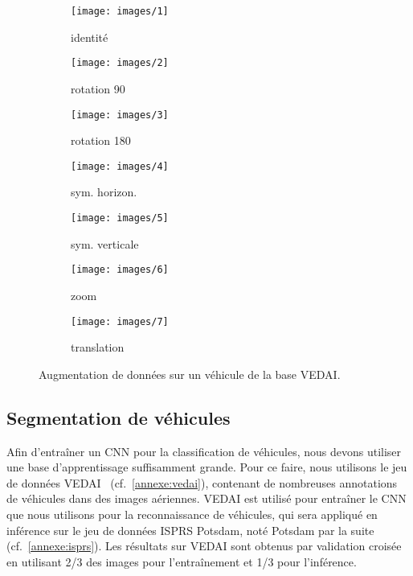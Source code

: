 \begin{figure}[t]
	\begin{subfigure}{0.142\textwidth}
    	\texttt{[image: images/1]}
        \caption*{identité}
    \end{subfigure}%
    \begin{subfigure}{0.142\textwidth}
    	\texttt{[image: images/2]}
        \caption*{rotation 90\degre}
    \end{subfigure}%
    \begin{subfigure}{0.142\textwidth}
    	\texttt{[image: images/3]}
        \caption*{rotation 180\degre}
    \end{subfigure}%
    \begin{subfigure}{0.142\textwidth}
    	\texttt{[image: images/4]}
        \caption*{sym. horizon.}
    \end{subfigure}%
    \begin{subfigure}{0.142\textwidth}
    	\texttt{[image: images/5]}
        \caption*{sym. verticale}
    \end{subfigure}%
    \begin{subfigure}{0.142\textwidth}
    	\texttt{[image: images/6]}
        \caption*{zoom}
    \end{subfigure}%
    \begin{subfigure}{0.142\textwidth}
    	\texttt{[image: images/7]}
        \caption*{translation}
    \end{subfigure}
    \caption{Augmentation de données sur un véhicule de la base \gls{VEDAI}.}
    \label{fig:augmented_car}
\end{figure}

\subsection{Segmentation de véhicules}

Afin d'entraîner un \gls{CNN} pour la classification de véhicules, nous devons utiliser une base d'apprentissage suffisamment grande. Pour ce faire, nous utilisons le jeu de données \gls{VEDAI}~\cite{razakarivony_vehicle_2016} (cf.~\cref{annexe:vedai}), contenant de nombreuses annotations de véhicules dans des images aériennes. \gls{VEDAI} est utilisé pour entraîner le \gls{CNN} que nous utilisons pour la reconnaissance de véhicules, qui sera appliqué en inférence sur le jeu de données \gls{ISPRS} Potsdam, noté Potsdam par la suite (cf.~\cref{annexe:isprs}). Les résultats sur \gls{VEDAI} sont obtenus par validation croisée en utilisant 2/3 des images pour l'entraînement et 1/3 pour l'inférence.

